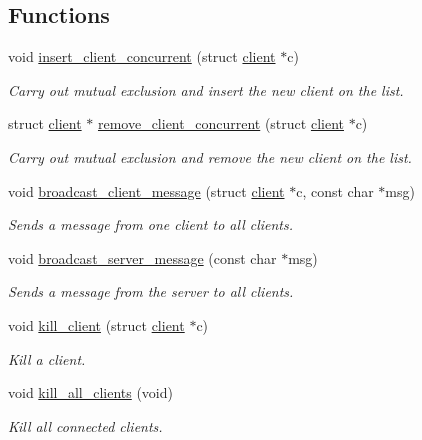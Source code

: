 \subsection*{Functions}
\begin{DoxyCompactItemize}
\item 
void \hyperlink{zip-zop-server_8c_a84f39912128d6dc7a66bbdd88fad00b5}{insert\+\_\+client\+\_\+concurrent} (struct \hyperlink{structclient}{client} $\ast$c)
\begin{DoxyCompactList}\small\item\em Carry out mutual exclusion and insert the new client on the list. \end{DoxyCompactList}\item 
struct \hyperlink{structclient}{client} $\ast$ \hyperlink{zip-zop-server_8c_a37f14ecc30cc2b45249b544fe70f2b6d}{remove\+\_\+client\+\_\+concurrent} (struct \hyperlink{structclient}{client} $\ast$c)
\begin{DoxyCompactList}\small\item\em Carry out mutual exclusion and remove the new client on the list. \end{DoxyCompactList}\item 
void \hyperlink{zip-zop-server_8c_a36e911ded647a0697ca152cae890bcf5}{broadcast\+\_\+client\+\_\+message} (struct \hyperlink{structclient}{client} $\ast$c, const char $\ast$msg)
\begin{DoxyCompactList}\small\item\em Sends a message from one client to all clients. \end{DoxyCompactList}\item 
void \hyperlink{zip-zop-server_8c_a74c8ecf978805ab40daaee7c593c82ee}{broadcast\+\_\+server\+\_\+message} (const char $\ast$msg)
\begin{DoxyCompactList}\small\item\em Sends a message from the server to all clients. \end{DoxyCompactList}\item 
void \hyperlink{zip-zop-server_8c_ae5845d7e65c1c7407d1df63105450b5e}{kill\+\_\+client} (struct \hyperlink{structclient}{client} $\ast$c)
\begin{DoxyCompactList}\small\item\em Kill a client. \end{DoxyCompactList}\item 
void \hyperlink{zip-zop-server_8c_ae3219dbffc65a1b8e1f4170f205f647a}{kill\+\_\+all\+\_\+clients} (void)
\begin{DoxyCompactList}\small\item\em Kill all connected clients. \end{DoxyCompactList}\item 

\end{DoxyCompactItemize}
